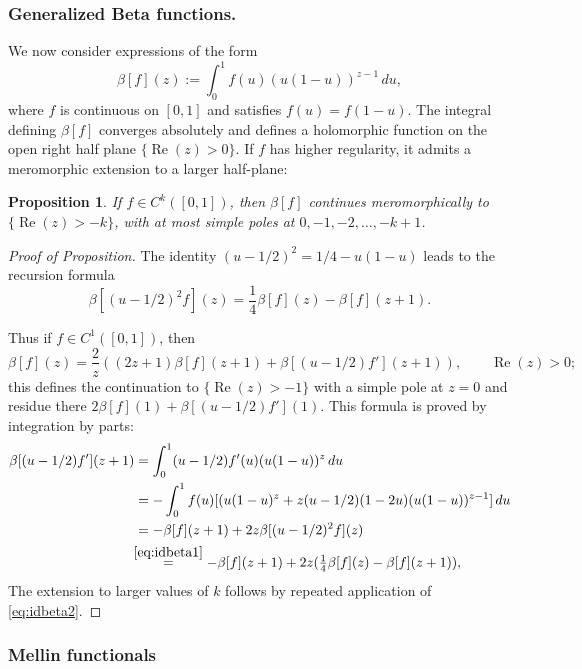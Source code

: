 \documentclass[11pt]{article}
\DeclareMathOperator{\Real}{Re}
\theoremstyle{plain}
\newtheorem{Proposition}[Theorem]{Proposition}
\theoremstyle{definition}
\theoremstyle{remark}
\begin{document}
\subsubsection*{Generalized Beta functions.}
We now consider expressions of the form
\begin{equation*}
\beta[f](z) := \int_0^1 f(u) (u(1-u))^{z-1}\,du,
\end{equation*}
where $f$ is continuous on $[0,1]$ and satisfies $f(u) = f(1-u)$. The integral defining $\beta[f]$ converges absolutely and defines a holomorphic function
on the open right half plane $\{\Real(z)>0\}$. If $f$ has higher regularity, it admits a meromorphic extension to a larger half-plane:
\begin{Proposition}\label{prop:merocont}
If $f\in C^k([0,1])$, then $\beta[f]$ continues meromorphically to $\{\Real(z)>-k\}$, with at most simple poles at $0, -1, -2, \dots, -k+1$.
\end{Proposition}
\begin{proof}[Proof of Proposition]
The identity $(u-1/2)^2 = 1/4 - u(1-u)$ leads to the recursion formula
\begin{equation}
\beta[(u-1/2)^2 f](z) = \frac{1}{4} \beta[f](z) - \beta[f] (z+1).
\label{eq:idbeta1}
\end{equation}

Thus if $f\in C^1([0,1])$, then
\begin{equation}
\beta[f](z) = \frac{2}{z} \left((2z+1) \beta[f] (z+1) + \beta[(u-1/2)f'] (z+1) \right), \qquad \Real(z)>0;
\label{eq:idbeta2}
\end{equation}
this defines the continuation to $\{\Real(z)>-1\}$ with a simple pole at $z=0$ and residue there
$2\beta[f](1) + \beta[(u-1/2)f'](1)$. This formula is proved by integration by parts:
\begin{align*}
\beta[(u-1/2)f'](z+1) &= \int_0^1 (u-1/2)f'(u) (u(1-u))^z\,du \\
&= - \int_0^1 f(u) [(u(1-u)^z + z (u-1/2)(1-2u) (u(1-u))^{z-1}]\,du \\
&= - \beta[f] (z+1) + 2z \beta[(u-1/2)^2 f](z) \\
&\!\!\stackrel{\eqref{eq:idbeta1}}{=} - \beta[f] (z+1) + 2z (\tfrac{1}{4} \beta[f](z) - \beta[f] (z+1)),
\end{align*}
The extension to larger values of $k$ follows by repeated application of \eqref{eq:idbeta2}.
\end{proof}

\subsubsection{Mellin functionals} \label{sec:Mellin}
\end{document}
